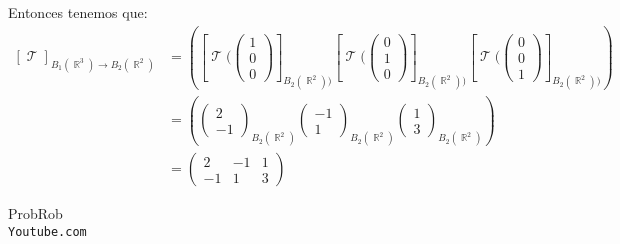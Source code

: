 \documentclass[12pt]{report}                                %
\DeclareMathOperator \Real {\mathbb{R}}
\DeclareMathOperator \LinealTransformation {\mathcal{T}}
\begin{document}
            Entonces tenemos que:
            \begin{equation*}
            \begin{split}
                [\LinealTransformation]_{B_{1}(\Real^3) \to B_{2}(\Real^2)} &= 
                \left(
                    \left[\LinealTransformation(\begin{pmatrix} 1\\0\\0\end{pmatrix}\right]_{B_{2}(\Real^2))}
                    \left[\LinealTransformation(\begin{pmatrix} 0\\1\\0\end{pmatrix}\right]_{B_{2}(\Real^2))}
                    \left[\LinealTransformation(\begin{pmatrix} 0\\0\\1\end{pmatrix}\right]_{B_{2}(\Real^2))}
                \right)\\
                &=
                \left(
                    \begin{pmatrix} 2 \\-1\end{pmatrix}_{B_{2}(\Real^2)}
                    \begin{pmatrix} -1\\ 1\end{pmatrix}_{B_{2}(\Real^2)}
                    \begin{pmatrix} 1 \\ 3\end{pmatrix}_{B_{2}(\Real^2)}
                \right)\\
                &=
                \begin{pmatrix} 2&-1&1\\-1&1&3\end{pmatrix}
            \end{split}
            \end{equation*}




\clearpage

    \begin{thebibliography}{9}

        ProbRob
        \\\texttt{Youtube.com}


     

\end{thebibliography}
\end{document}
